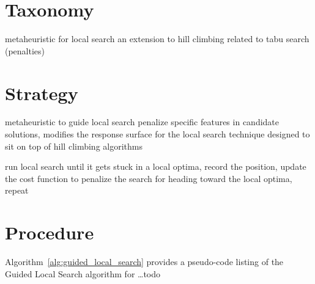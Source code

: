 \documentclass[a4paper, 11pt]{article}
\begin{document}
\section{Taxonomy}
\label{sec:taxonomy}
metaheuristic for local search
an extension to hill climbing
related to tabu search (penalties)


\section{Strategy}
\label{sec:strategy}
metaheuristic to guide local search
penalize specific features in candidate solutions, modifies the response surface for the local search technique
designed to sit on top of hill climbing algorithms

run local search until it gets stuck in a local optima, record the position, update the cost function to penalize the search for heading toward the local optima, repeat


\section{Procedure}
\label{sec:procedure}
Algorithm~\ref{alg:guided_local_search} provides a pseudo-code listing of the Guided Local Search algorithm for \ldots todo
\end{document}

